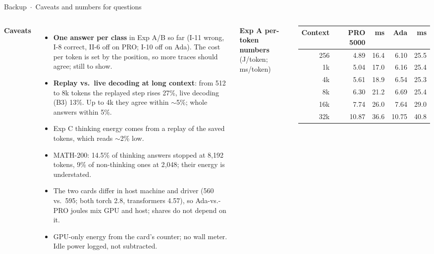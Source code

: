 \documentclass[aspectratio=169,9pt]{beamer}
\newcommand{\hd}[1]{{\color{accent}\bfseries #1}}
\begin{document}
\begin{frame}{Backup \,$\cdot$\, Caveats and numbers for questions}
  \begin{columns}[T,onlytextwidth]
    \hd{Caveats}
    \begin{itemize}\scriptsize
      \item \textbf{One answer per class} in Exp A/B so far (I-11 wrong, I-8 correct, II-6 off on PRO; I-10 off on Ada). The cost per token is set by the position, so more traces should agree; still to show.
      \item \textbf{Replay vs.\ live decoding at long context}: from 512 to 8k tokens the replayed step rises 27\%, live decoding (B3) 13\%. Up to 4k they agree within $\sim$5\%; whole answers within 5\%.
      \item Exp C thinking energy comes from a replay of the saved tokens, which reads $\sim$2\% low.
      \item MATH-200: 14.5\% of thinking answers stopped at 8{,}192 tokens, 9\% of non-thinking ones at 2{,}048; their energy is understated.
      \item The two cards differ in host machine and driver (560 vs.\ 595; both torch 2.8, transformers 4.57), so Ada-vs.-PRO joules mix GPU and host; shares do not depend on it.
      \item GPU-only energy from the card's counter; no wall meter. Idle power logged, not subtracted.
    \end{itemize}
    \hd{Exp A per-token numbers} {\scriptsize\color{muted}(J/token; ms/token)}\\[2pt]
    \scriptsize
    \begin{tabular}{@{}rrrrr@{}}
      \toprule
      Context & PRO 5000 & ms & Ada & ms \\
      \midrule
      256 & 4.89 & 16.4 & 6.10 & 25.5 \\
      1k & 5.04 & 17.0 & 6.16 & 25.4 \\
      4k & 5.61 & 18.9 & 6.54 & 25.3 \\
      8k & 6.30 & 21.2 & 6.69 & 25.4 \\
      16k & 7.74 & 26.0 & 7.64 & 29.0 \\
      32k & 10.87 & 36.6 & 10.75 & 40.8 \\
      \bottomrule
    \end{tabular}
    \vspace{4pt}


\end{columns}
\end{frame}
\end{document}

